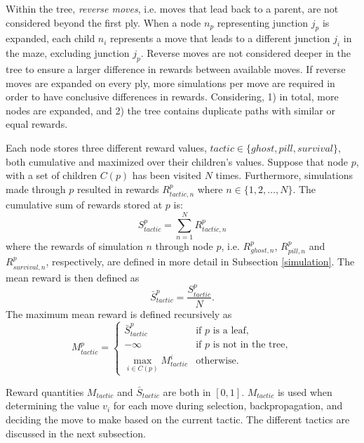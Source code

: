 \documentclass[journal]{IEEEtran}
\begin{document}
Within the tree, \emph{reverse moves}, i.e. moves that lead back to a parent, are not considered beyond the first ply. When a node $n_p$ representing junction $j_p$ is expanded, each child $n_i$ represents a move that leads to a different junction $j_i$ in the maze, excluding junction $j_p$. Reverse moves are not considered deeper in the tree to ensure a larger difference in rewards between available moves. If reverse moves are expanded on every ply, more simulations per move are required in order to have conclusive differences in rewards. Considering, 1) in total, more nodes are expanded, and 2) the tree contains duplicate paths with similar or equal rewards.

Each node stores three different reward values, $tactic \in \{ghost, pill, survival\}$, both cumulative and maximized over their children's values. Suppose that node $p$, with a set of children $C(p)$ has been visited $N$ times. Furthermore, simulations made through $p$ resulted in rewards $R_{tactic, n}^p$ where $n\in\{1,2, \dots, N\}$. The cumulative sum of rewards stored at $p$ is:
\begin{equation}
S_{tactic}^p = \sum_{n = 1}^{N}{R_{tactic,n}^p} 
\end{equation}
where the rewards of simulation $n$ through node $p$, i.e. $R_{ghost, n}^p$, $R_{pill, n}^p$ and $R_{survival, n}^p$, respectively, 
are defined in more detail in Subsection \ref{simulation}. 
The mean reward is then defined as 
\[\bar{S}_{tactic}^p = \frac{S_{tactic}^p}{N}.\]
The maximum mean reward is defined recursively as
\begin{equation}
M_{tactic}^p =
\begin{cases}
   \bar{S}_{tactic}^p & \text{if $p$ is a leaf}, \\
   -\infty & \text{if $p$ is not in the tree}, \\
   \max_{i \in C(p)}{M_{tactic}^i} & \text{otherwise}.
\end{cases}
\label{eq:maxback}
\end{equation}

Reward quantities $M_{tactic}$ and $\bar{S}_{tactic}$ are both in $[0,1]$. $M_{tactic}$ is used when determining the value $v_i$ for each move during selection, backpropagation, and deciding the move to make based on the current tactic. The different tactics are discussed in the next subsection.
\end{document}
